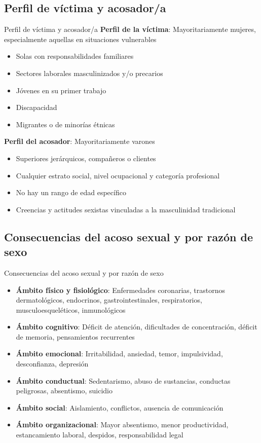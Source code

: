 \documentclass{beamer}
\begin{document}
    \subsection{Perfil de víctima y acosador/a}
    \begin{frame}{Perfil de víctima y acosador/a}
        \textbf{Perfil de la víctima}: Mayoritariamente mujeres, especialmente aquellas en situaciones vulnerables
        \begin{itemize}
            \item Solas con responsabilidades familiares
            \item Sectores laborales masculinizados y/o precarios
            \item Jóvenes en su primer trabajo
            \item Discapacidad
            \item Migrantes o de minorías étnicas
        \end{itemize}
        \textbf{Perfil del acosador}: Mayoritariamente varones
        \begin{itemize}
            \item Superiores jerárquicos, compañeros o clientes
            \item Cualquier estrato social, nivel ocupacional y categoría profesional
            \item No hay un rango de edad específico
            \item Creencias y actitudes sexistas vinculadas a la masculinidad tradicional
        \end{itemize}
    \end{frame}

    \subsection{Consecuencias del acoso sexual y por razón de sexo}
    \begin{frame}{Consecuencias del acoso sexual y por razón de sexo}
        \begin{itemize}
            \item \textbf{Ámbito físico y fisiológico}: Enfermedades coronarias, trastornos dermatológicos, endocrinos, gastrointestinales, respiratorios, musculoesqueléticos, inmunológicos
            \item \textbf{Ámbito cognitivo}: Déficit de atención, dificultades de concentración, déficit de memoria, pensamientos recurrentes
            \item \textbf{Ámbito emocional}: Irritabilidad, ansiedad, temor, impulsividad, desconfianza, depresión
            \item \textbf{Ámbito conductual}: Sedentarismo, abuso de sustancias, conductas peligrosas, absentismo, suicidio
            \item \textbf{Ámbito social}: Aislamiento, conflictos, ausencia de comunicación
            \item \textbf{Ámbito organizacional}: Mayor absentismo, menor productividad, estancamiento laboral, despidos, responsabilidad legal
        \end{itemize}
    \end{frame}
\end{document}
